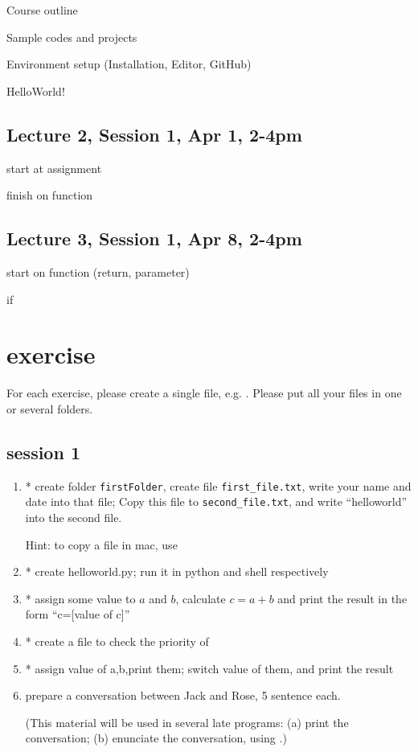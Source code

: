 \documentclass[aps,prb,12pt,tightenlines,%
notitlepage,longbibliography]{revtex4-1}
\begin{document}
Course outline

Sample codes and projects

Environment setup (Installation, Editor, GitHub)

HelloWorld!

\subsection{Lecture 2, Session 1, Apr 1, 2-4pm}
start at assignment

finish on function

\subsection{Lecture 3, Session 1, Apr 8, 2-4pm}
start on function (return, parameter)

if

\section{exercise}
For each exercise, please create a single  file, e.g. . Please put
all your files in one or several folders.
\subsection{session 1}
\begin{enumerate}
  \item *
    create folder \texttt{firstFolder}, create file
    \texttt{first\_file.txt}, write your name and date into that file;
    Copy this file to \texttt{second\_file.txt}, and write
    ``helloworld'' into the second file.

    Hint: to copy a file in mac, use 
  \item *
    create helloworld.py; run it in python and shell respectively
  \item *
    assign some value to $a$ and $b$, calculate $c=a+b$ and print the
    result in the form ``c=[value of c]''
  \item *
    create a file to check the priority of \code{+-*/=}
  \item *
    assign value of a,b,print them; switch value of them, and print
    the result

  \item
    prepare a conversation between Jack and Rose, 5 sentence each.
    
    (This material will be used in several late programs: (a) print
    the conversation; (b) enunciate the conversation, using .)
\end{enumerate}
\end{document}

